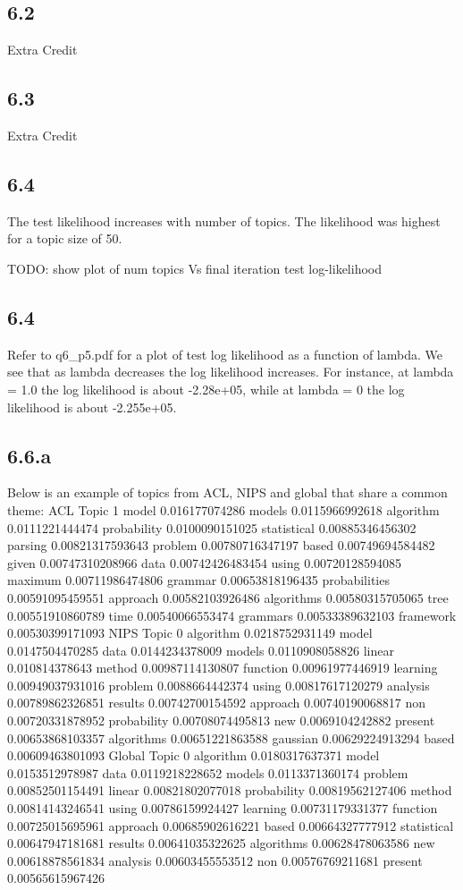 \documentclass{article}
\begin{document}
\subsection*{6.2}

Extra Credit

\subsection*{6.3}

Extra Credit

\subsection*{6.4}
The test likelihood increases with number of topics. The likelihood was highest for a topic size of 50.

TODO: show plot of num topics Vs final iteration test log-likelihood

\subsection*{6.4}

Refer to q6_p5.pdf for a plot of test log likelihood as a function of lambda. We see that as lambda decreases the log likelihood
increases. For instance, at lambda = 1.0 the log likelihood is about -2.28e+05, while at lambda = 0 the log likelihood is about
-2.255e+05.

\subsection*{6.6.a}
Below is an example of topics from ACL, NIPS and global that share a common theme:
ACL
Topic 1
model 0.016177074286
models 0.0115966992618
algorithm 0.0111221444474
probability 0.0100090151025
statistical 0.00885346456302
parsing 0.00821317593643
problem 0.00780716347197
based 0.00749694584482
given 0.00747310208966
data 0.00742426483454
using 0.00720128594085
maximum 0.00711986474806
grammar 0.00653818196435
probabilities 0.00591095459551
approach 0.00582103926486
algorithms 0.00580315705065
tree 0.00551910860789
time 0.00540066553474
grammars 0.00533389632103
framework 0.00530399171093
NIPS
Topic 0
algorithm 0.0218752931149
model 0.0147504470285
data 0.0144234378009
models 0.0110908058826
linear 0.010814378643
method 0.00987114130807
function 0.00961977446919
learning 0.00949037931016
problem 0.0088664442374
using 0.00817617120279
analysis 0.00789862326851
results 0.00742700154592
approach 0.00740190068817
non 0.00720331878952
probability 0.00708074495813
new 0.0069104242882
present 0.00653868103357
algorithms 0.00651221863588
gaussian 0.00629224913294
based 0.00609463801093
Global
Topic 0
algorithm 0.0180317637371
model 0.0153512978987
data 0.0119218228652
models 0.0113371360174
problem 0.00852501154491
linear 0.00821802077018
probability 0.00819562127406
method 0.00814143246541
using 0.00786159924427
learning 0.00731179331377
function 0.00725015695961
approach 0.00685902616221
based 0.00664327777912
statistical 0.00647947181681
results 0.00641035322625
algorithms 0.00628478063586
new 0.00618878561834
analysis 0.00603455553512
non 0.00576769211681
present 0.00565615967426
\end{document}
